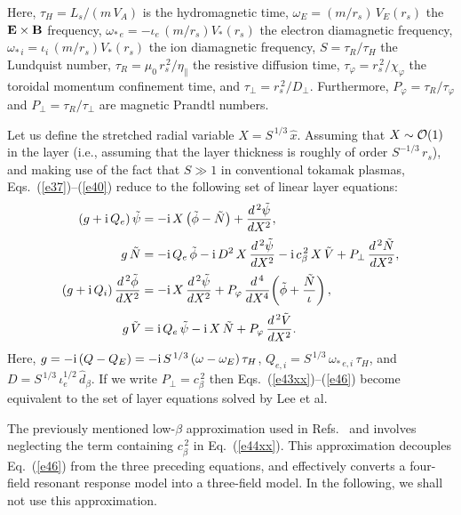 \documentclass[12pt,prb,aps]{revtex4-1}
\begin{document}
Here, 
$\tau_H = L_s/(m\,V_A)$ 
is the  hydromagnetic time, 
$\omega_E =(m/r_s)\,V_E(r_s)$
  the 
 ${\bf E}\times {\bf B}$ frequency, 
$\omega_{\ast\,e} = -\iota_e\,(m/r_s)V_\ast(r_s)$
the electron diamagnetic frequency,
$\omega_{\ast\,i} =\iota_i\,(m/r_s)V_\ast(r_s)$
 the  ion diamagnetic frequency,  $S=\tau_R/\tau_H$ the  Lundquist number, 
$\tau_R = \mu_0\,r_s^{\,2}/\eta_\parallel$
 the
 resistive diffusion time, 
$\tau_\varphi
= r_s^{\,2}/\chi_\varphi$
the  toroidal momentum confinement time, and 
$\tau_\perp = r_s^{\,2}/D_\perp$.
  Furthermore, $P_\varphi = \tau_R/\tau_\varphi$ and $P_\perp = \tau_R/\tau_\perp$ are magnetic Prandtl numbers.

 Let us define the stretched radial variable $X = S^{\,1/3}\,\hat{x}$.
Assuming that $X\sim{\cal O}(1)$ in the layer (i.e., assuming that the layer thickness is roughly of order $S^{-1/3}\,r_s$),
and making use of the fact that $S\gg 1$ in conventional tokamak plasmas,  Eqs.~(\ref{e37})--(\ref{e40}) reduce to the following
set of linear layer equations:\,\cite{cole}
\begin{align}\label{e43xx}
(g+{\rm i}\,Q_e)\,\tilde{\psi}&= - {\rm i}\,X\left(\tilde{\phi}-\tilde{N}\right)+ \frac{d^{\,2}\tilde{\psi}}{d X^2},\\[0.5ex]
g\,\tilde{N} &= - {\rm i}\,Q_{e}\,\tilde{\phi}   - {\rm i} \,D^{2}\,X\,\frac{d^{\,2}\tilde{\psi}}{dX^{2}}- {\rm i}\,c_\beta^{\,2}\,X\,\tilde{V}
+ P_\perp\,\frac{d^{\,2} \tilde{N}}{dX^{2}},\label{e44xx}\\[0.5ex]
(g+{\rm i}\,Q_i)\,\frac{d^{\,2}\tilde{\phi}}{dX^2}&= - {\rm i}\,X\,\frac{d^{\,2}\tilde{\psi}}{dX^2}+ P_\varphi\,\frac{d^{\,4}}{dX^4}\!\left(\tilde{\phi} + \frac{\tilde{N}}{\iota}\right),\\[0.5ex]
g\,\tilde{V} &= {\rm i}\,Q_{e}\,\tilde{\psi} - {\rm i}\,X\,\tilde{N} + P_\varphi\,\frac{d^{\,2}\tilde{V}}{dX^{2}}.\label{e46}
\end{align}
Here, $g = -{\rm i}\,(Q-Q_E)=-{\rm i}\,S^{\,1/3}\,(\omega-\omega_E)\,\tau_H$, $Q_{e,i} = S^{\,1/3}\,\omega_{\ast\,e,i}\,\tau_H$,
and $D = S^{\,1/3}\,\iota_e^{1/2}\,\hat{d}_\beta$. If we write $P_\perp = c_\beta^{\,2}$
then Eqs.~(\ref{e43xx})--(\ref{e46}) become equivalent to the set of  layer equations solved by Lee et al.


The previously mentioned low-$\beta$ approximation used in Refs.~ and  involves neglecting the term
containing $c_\beta^{\,2}$ in Eq.~(\ref{e44xx}). This approximation decouples Eq.~(\ref{e46}) from the three preceding equations, and effectively
converts a four-field resonant response model into a three-field model. In the following, we shall not use this approximation.
\end{document}
